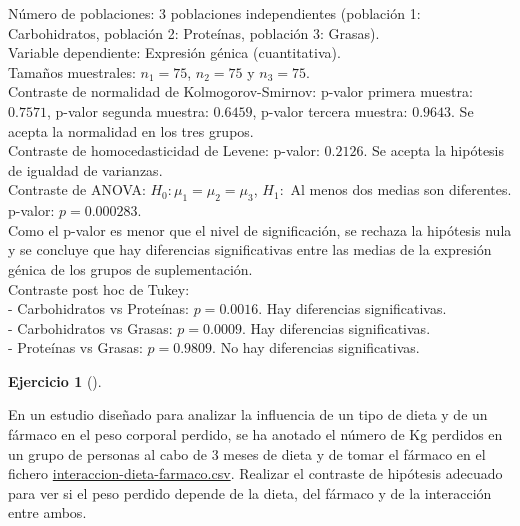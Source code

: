 \documentclass[
  a4paper,
]{scrreport}
\theoremstyle{definition}
\newtheorem{exercise}{Ejercicio}[chapter]
\theoremstyle{remark}
\begin{document}
\begin{tcolorbox}[enhanced jigsaw, breakable, opacityback=0, colbacktitle=quarto-callout-tip-color!10!white, colframe=quarto-callout-tip-color-frame, left=2mm, titlerule=0mm, coltitle=black, colback=white, bottomtitle=1mm, toptitle=1mm, opacitybacktitle=0.6, title=\textcolor{quarto-callout-tip-color}{\faLightbulb}\hspace{0.5em}{Solución}, leftrule=.75mm, bottomrule=.15mm, toprule=.15mm, rightrule=.15mm, arc=.35mm]

Número de poblaciones: 3 poblaciones independientes (población 1:
Carbohidratos, población 2: Proteínas, población 3: Grasas).\\
Variable dependiente: Expresión génica (cuantitativa).\\
Tamaños muestrales: \(n_1=75\), \(n_2=75\) y \(n_3=75\).\\
Contraste de normalidad de Kolmogorov-Smirnov: p-valor primera muestra:
\(0.7571\), p-valor segunda muestra: \(0.6459\), p-valor tercera
muestra: \(0.9643\). Se acepta la normalidad en los tres grupos.\\
Contraste de homocedasticidad de Levene: p-valor: \(0.2126\). Se acepta
la hipótesis de igualdad de varianzas.\\
Contraste de ANOVA: \(H_0:\mu_1=\mu_2=\mu_3\), \(H_1:\) Al menos dos
medias son diferentes.\\
p-valor: \(p=0.000283\).\\
Como el p-valor es menor que el nivel de significación, se rechaza la
hipótesis nula y se concluye que hay diferencias significativas entre
las medias de la expresión génica de los grupos de suplementación.\\
Contraste post hoc de Tukey:\\
- Carbohidratos vs Proteínas: \(p=0.0016\). Hay diferencias
significativas.\\
- Carbohidratos vs Grasas: \(p=0.0009\). Hay diferencias
significativas.\\
- Proteínas vs Grasas: \(p=0.9809\). No hay diferencias significativas.

\end{tcolorbox}

\begin{exercise}[]\protect\hypertarget{exr-contraste-anova-interaccion-dieta-farmaco}{}\label{exr-contraste-anova-interaccion-dieta-farmaco}

En un estudio diseñado para analizar la influencia de un tipo de dieta y
de un fármaco en el peso corporal perdido, se ha anotado el número de Kg
perdidos en un grupo de personas al cabo de 3 meses de dieta y de tomar
el fármaco en el fichero
\href{datos/interaccion-dieta-farmaco.csv}{interaccion-dieta-farmaco.csv}.
Realizar el contraste de hipótesis adecuado para ver si el peso perdido
depende de la dieta, del fármaco y de la interacción entre ambos.

\end{exercise}
\end{document}
